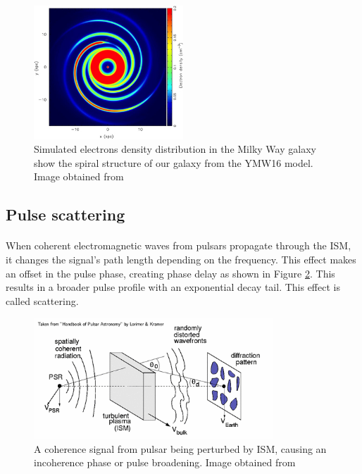 \documentclass[thesis_msc.tex]{subfiles}
\begin{document}
\begin{figure}[h]
\centering
\includegraphics[width=0.5\textwidth]{figures/nedist.jpg}
\caption{Simulated electrons density distribution in the Milky Way galaxy show the spiral structure of our galaxy from the YMW16 model. Image obtained from \citep{yao2017new}  }
\label{nedist}
\end{figure}

    
    \subsection{Pulse scattering}
\paragraph{} When coherent electromagnetic waves from pulsars propagate through the ISM, it changes the signal's path length depending on the frequency. This effect makes an offset in the pulse phase, creating phase delay as shown in Figure \ref{scatt}. This results in a broader pulse profile with an exponential decay tail. This effect is called scattering. 

 \begin{figure}[h] \centering 
\includegraphics[width=0.8\textwidth]{figures/scatt.png}
\caption{A coherence signal from pulsar being perturbed by ISM, causing an incoherence phase or pulse broadening. Image obtained from \citep{handbook}  }

\label{scatt}
\end{figure}
\end{document}
